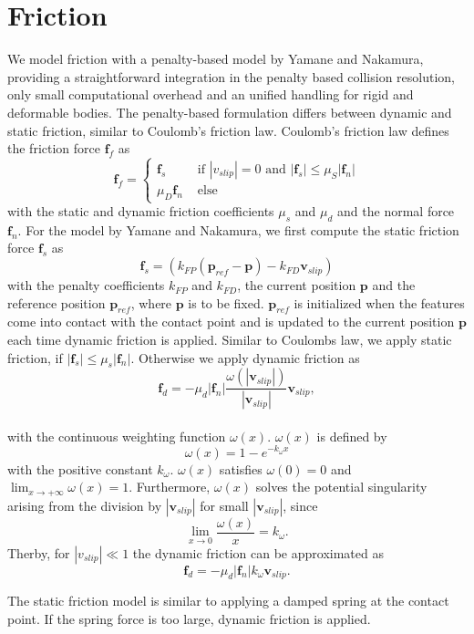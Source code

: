 \section{Friction}
\label{ch:Friction}
We model friction with a penalty-based model by Yamane and Nakamura\cite{YAMANE2006}, providing a straightforward integration in the penalty based collision resolution, only small computational overhead and an unified handling for rigid and deformable bodies. The penalty-based formulation differs between dynamic and static friction, similar to  Coulomb's friction law. 
Coulomb's friction law \cite{YAMANE2006} defines the friction force $\mathbf f_f$ as
\begin{equation}
\mathbf f_f=
\begin{cases}
\mathbf f_s & \text{ if } |v_{slip}|=0 \text{ and } |\mathbf f_{s}|\le\mu_S |\mathbf f_n| \\
\mu_D \mathbf f_n & \text{ else }
\end{cases}
\end{equation}
with the static and dynamic friction coefficients $\mu_s$ and $\mu_d$ and the normal force $\mathbf f_n$.
For the model by Yamane and Nakamura, we first compute the static friction force $\mathbf f_s$ as
\begin{equation}
\mathbf f_s= (k_{FP}(\mathbf p_{ref} - \mathbf p)-k_{FD}\mathbf v_{slip} )
\end{equation}
with the penalty coefficients $k_{FP}$ and $k_{FD}$, the current position $\mathbf p$ and the reference position $\mathbf p_{ref}$, where $\mathbf p$ is to be fixed. $\mathbf p_{ref}$ is initialized when the features come into contact with the contact point and is updated to the current position $\mathbf p$ each time dynamic friction is applied. Similar to Coulombs law, we apply static friction, if $|\mathbf f_s|\le\mu_s|\mathbf f_n|$. Otherwise we apply dynamic friction as
\begin{equation}
\mathbf f_d=-\mu_d |\mathbf f_n| \frac{\omega (|\mathbf{v}_{slip}|)}{|\mathbf{v}_{slip}|}\mathbf{v}_{slip},
\end{equation}\\
with the continuous weighting function $\omega(x)$.  $\omega(x)$ is defined by
\begin{equation}
\omega(x)=1-e^{-k_\omega x}
\end{equation}
with the positive constant $k_\omega$. $\omega (x)$ satisfies $\omega(0)=0$ and $\lim_{x \rightarrow + \infty}\omega(x)=1$. Furthermore, $\omega(x)$ solves the potential singularity arising from the division by $|\mathbf v_{slip}|$ for small $|\mathbf{v}_{slip}|$, since 
\begin{equation}
\lim\limits_{x\rightarrow 0}\frac{\omega (x)}{x}=k_{\omega}.
\end{equation}
Therby, for $|v_{slip}| \ll 1$ the dynamic friction can be approximated as
\begin{equation}
\mathbf f_d=-\mu_d |\mathbf f_n| k_{\omega}\mathbf{v}_{slip}.
\end{equation}


The static friction model is similar to applying a damped spring at the contact point. If the spring force is too large, dynamic friction is applied.